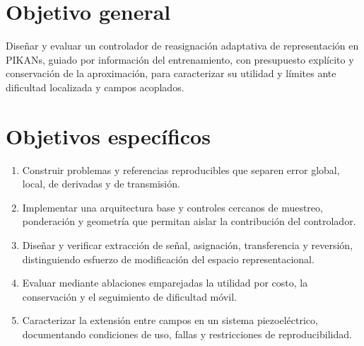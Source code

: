 \label{sec:objetivos}
\section{Objetivo general}
Diseñar y evaluar un controlador de reasignación adaptativa de representación en PIKANs, guiado por información del entrenamiento, con presupuesto explícito y conservación de la aproximación, para caracterizar su utilidad y límites ante dificultad localizada y campos acoplados.
\section{Objetivos específicos}
\begin{enumerate}
\item Construir problemas y referencias reproducibles que separen error global, local, de derivadas y de transmisión.
\item Implementar una arquitectura base y controles cercanos de muestreo, ponderación y geometría que permitan aislar la contribución del controlador.
\item Diseñar y verificar extracción de señal, asignación, transferencia y reversión, distinguiendo esfuerzo de modificación del espacio representacional.
\item Evaluar mediante ablaciones emparejadas la utilidad por costo, la conservación y el seguimiento de dificultad móvil.
\item Caracterizar la extensión entre campos en un sistema piezoeléctrico, documentando condiciones de uso, fallas y restricciones de reproducibilidad.
\end{enumerate}
